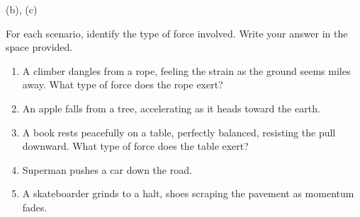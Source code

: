 \documentclass[answers]{exam}
\begin{document}
\begin{questions}
\begin{solutionorbox}[10cm]
(b), (c)

\begin{center}
\end{center}    
\end{solutionorbox}

\clearpage
\question[5]
For each scenario, identify the type of force involved. Write your answer in the space provided.

\begin{enumerate} %
    \item A climber dangles from a rope, feeling the strain as the ground seems miles away. What type of force does the rope exert? \\[1ex]
    \item An apple falls from a tree, accelerating as it heads toward the earth. \\[1ex]
    \fillin[gravity][5cm]
    \item A book rests peacefully on a table, perfectly balanced, resisting the pull downward. What type of force does the table exert? \\[1ex]
    \item Superman pushes a car down the road. \\[1ex]
    \item A skateboarder grinds to a halt, shoes scraping the pavement as momentum fades.\\[1ex]
\end{enumerate}



\end{questions}
\end{document}
